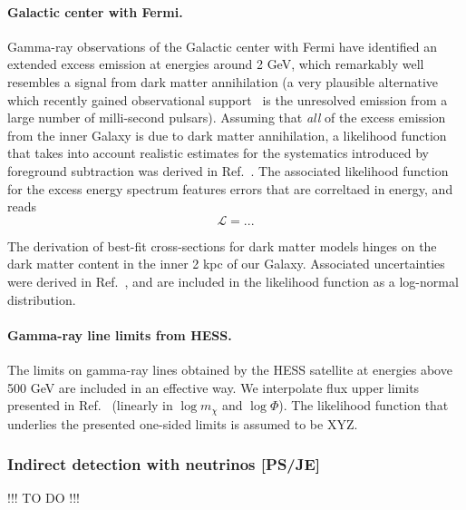 \paragraph{Galactic center with Fermi.}
Gamma-ray observations of the Galactic center with Fermi have identified an
extended excess emission at energies around 2 GeV, which remarkably well
resembles a signal from dark matter annihilation (a very plausible alternative
which recently gained observational support~\cite{123} is the
unresolved emission from a large number of milli-second pulsars).  Assuming
that \emph{all} of the excess emission from the inner Galaxy is due to dark
matter annihilation, a likelihood function that takes into account realistic
estimates for the systematics introduced by foreground subtraction was derived
in Ref.~\cite{123}.  The associated likelihood function for the excess energy
spectrum features errors that are correltaed in energy, and reads
\begin{equation}
  \mathcal{L} = ...
\end{equation}

The derivation of best-fit cross-sections for dark matter models hinges on the
dark matter content in the inner 2 kpc of our Galaxy.  Associated uncertainties
were derived in Ref.~\cite{123}, and are included in the likelihood function as
a log-normal distribution.

\paragraph{Gamma-ray line limits from HESS.}

The limits on gamma-ray lines obtained by the HESS satellite at energies above
500 GeV are included in an effective way.  We interpolate flux upper limits
presented in Ref.~\cite{123} (linearly in $\log m_\chi$ and $\log \Phi$).  The
likelihood function that underlies the presented one-sided limits is assumed to
be XYZ.



\subsubsection{Indirect detection with neutrinos {\bf [PS/JE]}}
\label{phys_nu}
\smallskip
{\color{red} !!! TO DO !!!}
\smallskip





